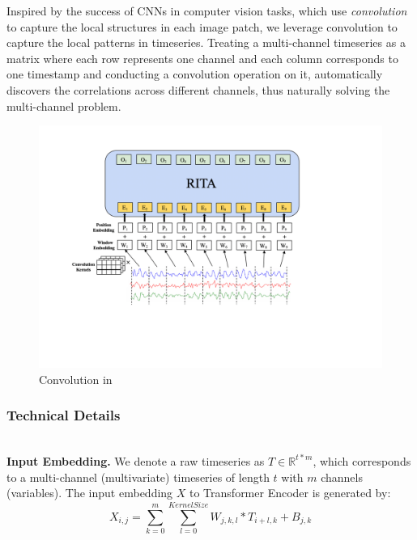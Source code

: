 \begin{sloppypar}
Inspired by the success of CNNs in computer vision tasks, which use {\it convolution} to capture the local structures in each image patch, we leverage convolution to capture the local patterns in timeseries. Treating a multi-channel timeseries as a matrix where each row represents one channel and each column corresponds to one timestamp and conducting a convolution operation on it, \system automatically discovers the correlations across different channels, thus naturally solving the multi-channel problem.


\begin{figure}[t]
    \centering
    \includegraphics[width=1.0\columnwidth]{figures/rita_conv.pdf}
    \vspace{-5mm}
    \caption{Convolution in \system}
    \label{fig.convolution}
    \vspace{-6mm}
\end{figure}

\subsubsection{Technical Details\nopunct}\ \\
\noindent\textbf{Input Embedding.}
We denote a raw timeseries as $T \in \mathbb{R}^{t*m}$, which corresponds to a multi-channel (multivariate) timeseries of length $t$ with $m$ channels (variables). The input embedding $X$ to Transformer Encoder is generated by:
\vspace{-1mm}
\begin{equation}
\label{eq.convolution}
X_{i,j}=\sum_{k=0}^m  \sum_{l=0}^{KernelSize}W_{j,k,l}*T_{i+l,k}+ B_{j,k} 
\end{equation}


\end{sloppypar}

